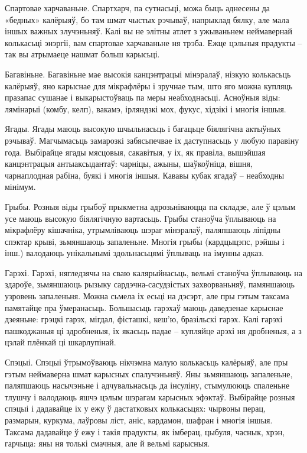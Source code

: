 Спартовае харчаваньне.
Спартхарч, па сутнасьці, можа быць аднесены да «бедных» калёрыяў, бо там шмат чыстых рэчываў, напрыклад бялку, але мала іншых важных злучэньняў. Калі вы не элітны атлет з ужываньнем неймавернай колькасьці энэргіі, вам спартовае харчаваньне ня трэба. Ежце цэльныя прадукты – так вы атрымаеце нашмат больш карысьці.

Багавіньне.
Багавіньне мае высокія канцэнтрацыі мінэралаў, нізкую колькасьць калёрыяў, яно карыснае для мікрафлёры і зручнае тым, што яго можна купляць празапас сушанае і выкарыстоўваць па меры неабходнасьці. Асноўныя віды: лямінарыі (комбу, келп), вакамэ, ірляндзкі мох, фукус, хідзікі і многія іншыя.

Ягады.
Ягады маюць высокую шчыльнасьць і багацьце біялягічна актыўных рэчываў. Магчымасьць замарозкі забясьпечвае іх даступнасьць у любую паравіну года. Выбірайце ягады мясцовыя, сакавітыя, у іх, як правіла, вышэйшая канцэнтрацыя антыаксыдантаў: чарніцы, ажыны, шаўкоўніца, вішня, чарнаплодная рабіна, буякі і многія іншыя. Кававы кубак ягадаў – неабходны мінімум.

Грыбы.
Розныя віды грыбоў прыкметна адрозьніваюцца па складзе, але ў цэлым усе маюць высокую біялягічную вартасьць. Грыбы станоўча ўплываюць на мікрафлёру кішачніка, утрымліваюць шэраг мінэралаў, паляпшаюць ліпідны спэктар крыві, зьмяншаюць запаленьне. Многія грыбы (кардцыцэпс, рэйшы і інш.) валодаюць унікальнымі здольнасьцямі ўплываць на імунны адказ.

Гарэхі.
Гарэхі, нягледзячы на сваю калярыйнасьць, вельмі станоўча ўплываюць на здароўе, зьмяншаюць рызыку сардэчна-сасудзістых захворваньняў, памяншаюць узровень запаленьня. Можна сьмела іх есьці на дэсэрт, але пры гэтым таксама памятайце пра ўмеранасьць. Большасьць гарэхаў маюць даведзенае карыснае дзеяньне: грэцкі гарэх, мігдал, фісташкі, кеш'ю, бразільскі гарэх. Калі гарэхі пашкоджаныя ці здробненыя, іх якасьць падае – купляйце арэхі ня дробненыя, а з цэлай плёнкай ці шкарлупінай.

Спэцыі.
Спэцыі ўтрымоўваюць нікчэмна малую колькасьць калёрыяў, але пры гэтым неймаверна шмат карысных спалучэньняў. Яны зьмяншаюць запаленьне, паляпшаюць насычэньне і адчувальнасьць да інсуліну, стымулююць спаленьне тлушчу і валодаюць яшчэ цэлым шэрагам карысных эфэктаў. Выбірайце розныя спэцыі і дадавайце іх у ежу ў дастатковых колькасьцях: чырвоны перац, размарын, куркума, лаўровы ліст, аніс, кардамон, шафран і многія іншыя. Таксама дадавайце ў ежу і такія прадукты, як імберац, цыбуля, часнык, хрэн, гарчыца: яны ня толькі смачныя, але й вельмі карысныя.

